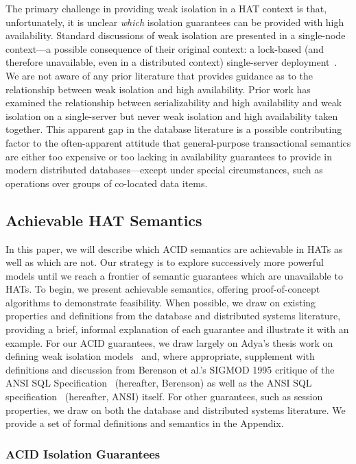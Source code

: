 The primary challenge in providing weak isolation in a HAT context is
that, unfortunately, it is unclear \textit{which} isolation guarantees
can be provided with high availability. Standard discussions of weak
isolation are presented in a single-node context---a possible
consequence of their original context: a lock-based (and therefore
unavailable, even in a distributed context) single-server
deployment~\cite{needed}. We are not aware of any prior literature
that provides guidance as to the relationship between weak isolation
and high availability. Prior work has examined the relationship
between serializability and high availability and weak isolation on a
single-server but never weak isolation and high availability taken
together. This apparent gap in the database literature is a possible
contributing factor to the often-apparent attitude that
general-purpose transactional semantics are either too expensive or
too lacking in availability guarantees to provide in modern
distributed databases---except under special circumstances, such as
operations over groups of co-located data items.

\subsection{Achievable HAT Semantics}

In this paper, we will describe which ACID semantics are achievable in
HATs as well as which are not. Our strategy is to explore successively
more powerful models until we reach a frontier of semantic guarantees
which are unavailable to HATs. To begin, we present achievable
semantics, offering proof-of-concept algorithms to demonstrate
feasibility. When possible, we draw on existing properties and
definitions from the database and distributed systems literature,
providing a brief, informal explanation of each guarantee and
illustrate it with an example. For our ACID guarantees, we draw
largely on Adya's thesis work on defining weak isolation
models~\cite{needed} and, where appropriate, supplement with
definitions and discussion from Berenson et al.'s SIGMOD 1995 critique
of the ANSI SQL Specification~\cite{needed} (hereafter, Berenson) as
well as the ANSI SQL specification~\cite{needed} (hereafter, ANSI)
itself. For other guarantees, such as session properties, we draw on
both the database and distributed systems literature. We provide a set
of formal definitions and semantics in the Appendix.

\subsubsection{ACID Isolation Guarantees}

